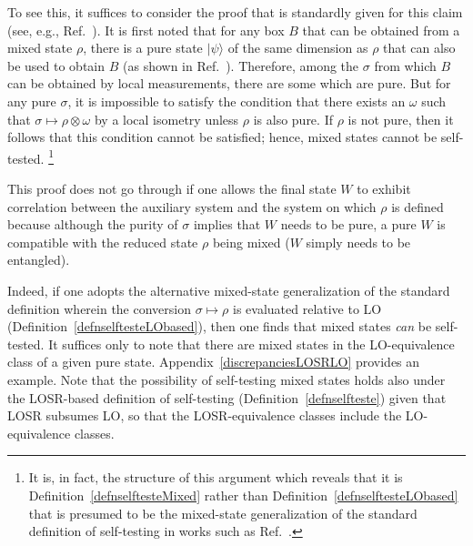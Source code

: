 \documentclass[12pt]{article}
\theoremstyle{plain}
\theoremstyle{definition}
\begin{document}
To see this, it suffices to consider the proof that is standardly given for this claim 
 (see, e.g., Ref.~\cite{vsupic2020self}).  It is first noted that for any box $B$ that can be obtained from a mixed state $\rho$, there is a pure state $|\psi\rangle$ of the same dimension as $\rho$ that can also be used to obtain $B$ (as shown in Ref.~\cite{Sikora2016HSD}).  Therefore, among the $\sigma$ from which $B$ can be obtained by local measurements, there are some which are pure.  But for any pure $\sigma$, it is impossible to satisfy the condition that there exists an $\omega$ such that $\sigma \mapsto \rho \otimes \omega$ by a local isometry unless $\rho$ is also pure. If $\rho$ is not pure, then it follows that this condition cannot be satisfied; hence, mixed states cannot be self-tested.
 \footnote{It is, in fact, the structure of this argument which reveals that it is Definition~\ref{defnselftesteMixed} rather than Definition~\ref{defnselftesteLObased} that is presumed to be the mixed-state generalization of the standard definition of self-testing in works such as Ref.~\cite{vsupic2020self}.}
 
 
This proof does not go through if one allows the final state $W$ to exhibit correlation between the auxiliary system and the system on which $\rho$ is defined because although the purity of $\sigma$ implies that $W$ needs to be pure, a pure $W$ is compatible with the reduced state $\rho$ being mixed ($W$ simply needs to be entangled).

Indeed, if one adopts the alternative mixed-state generalization of the standard definition wherein the conversion $\sigma \mapsto \rho$ is evaluated relative to LO (Definition~\ref{defnselftesteLObased}), then one finds that mixed states {\em can} be self-tested.  It suffices only to note that there are mixed states in the LO-equivalence class of a given pure state.  Appendix~\ref{discrepanciesLOSRLO} provides an example. 
Note that the possibility of self-testing mixed states holds also under the LOSR-based definition of self-testing (Definition~\ref{defnselfteste}) given that LOSR subsumes LO, so that the LOSR-equivalence classes include the LO-equivalence classes.
\end{document}
